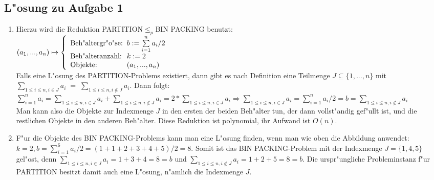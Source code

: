 \documentclass[10pt,oneside,onecolumn,a4paper,german,titlepage]{article}
\begin{document}
\newpage

\subsection*{L"osung zu Aufgabe 1}
\begin{enumerate}
\item Hierzu wird die Reduktion PARTITION$\leq_p$BIN PACKING benutzt:\\[4pt]
$(a_1,...,a_n) \mapsto
\left\{\begin{array}{l@{\hspace{0.2cm}}l}
\mbox{Beh"altergr"o"se:} & b := \sum\limits_{i=1}^n a_i/2\\
\mbox{Beh"alteranzahl:} & k := 2\\
\mbox{Objekte:} & (a_1,...,a_n)\\
\end{array}\right.$\\[4pt]
Falls eine L"osung des PARTITION-Problems existiert, dann gibt es nach Definition
eine Teilmenge $J \subseteq \{1,...,n\}$ mit $\sum\limits_{1 \leq i \leq n, i \in J}
a_i \; = \; \sum\limits_{1 \leq i \leq n, i \notin J} a_i$. Dann folgt:\\[4pt]
$\sum\limits_{i=1}^n a_i = \sum\limits_{1 \leq i \leq n, i \in J} a_i +
\sum\limits_{1 \leq i \leq n, i \notin J} a_i = 2 * \sum\limits_{1 \leq i \leq n,
i \in J} a_i  \Rightarrow \sum\limits_{1 \leq i \leq n, i \in J} a_i =
\sum\limits_{i=1}^n a_i/2 = b = \sum\limits_{1 \leq i \leq n, i \notin J} a_i$\\[4pt]
Man kann also die Objekte zur Indexmenge $J$ in den ersten der beiden Beh"alter tun,
der dann vollst"andig gef"ullt ist, und die restlichen Objekte in den anderen
Beh"alter. Diese Reduktion ist polynomial, ihr Aufwand ist $O(n)$.
\item F"ur die Objekte des BIN PACKING-Problems kann man eine L"osung finden, wenn
man wie oben die Abbildung anwendet: $k = 2, b = \sum\limits_{i=1}^6 a_i/2 =
(1+1+2+3+4+5)/2 = 8$. Somit ist das BIN PACKING-Problem mit der Indexmenge $J =
\{1,4,5\}$ gel"ost, denn $\sum\limits_{1 \leq i \leq n, i \in J} a_i = 1+3+4 = 8 =
b$ und $\sum\limits_{1 \leq i \leq n, i \notin J} a_i = 1+2+5 = 8 = b$. Die
urspr"ungliche Probleminstanz f"ur PARTITION besitzt damit auch eine L"osung,
n"amlich die Indexmenge $J$.
\end{enumerate}
\end{document}
